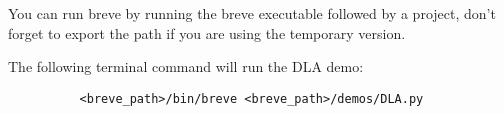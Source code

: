 	You can run breve by running the breve executable followed by a project, don't forget to export the path if you are using the temporary version.
	
	The following terminal command will run the DLA demo:
	\begin{verbatim}
		  <breve_path>/bin/breve <breve_path>/demos/DLA.py
	\end{verbatim}
